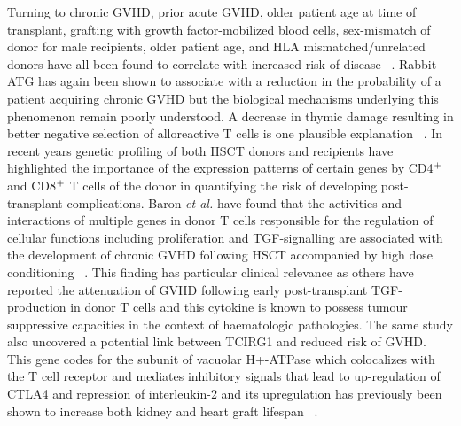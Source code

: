 Turning to chronic GVHD, prior acute GVHD, older patient age at time of transplant, grafting with growth factor-mobilized blood cells, sex-mismatch of donor for male recipients, older patient age, and HLA mismatched/unrelated donors have all been found to correlate with increased risk of disease ~\autocite{Flo2011}. Rabbit ATG has again been shown to associate with a reduction in the probability of a patient acquiring chronic GVHD but the biological mechanisms underlying this phenomenon remain poorly understood. A decrease in thymic damage resulting in better negative selection of alloreactive T cells is one plausible explanation ~\autocite{Flo2011}. In recent years genetic profiling of both HSCT donors and recipients have highlighted the importance of the expression patterns of certain genes by CD4$\textsuperscript{+}$ and CD8$\textsuperscript{+}$ T cells of the donor in quantifying the risk of developing post-transplant complications. Baron \textit{et al.} have found that the activities and interactions of multiple genes in donor T cells responsible for the regulation of cellular functions including proliferation and TGF-\textbeta signalling are associated with the development of chronic GVHD following HSCT accompanied by high dose conditioning ~\autocite{Bar2007}. This finding has particular clinical relevance as others have reported the attenuation of GVHD following early post-transplant TGF-\textbeta production in donor T cells and this cytokine is known to possess tumour suppressive capacities in the context of haematologic pathologies. The same study also uncovered a potential link between TCIRG1 and reduced risk of GVHD. This gene codes for the  subunit of vacuolar H+-ATPase which colocalizes with the T cell receptor and mediates inhibitory signals that lead to up-regulation of CTLA4 and repression of interleukin-2 and its upregulation has previously been shown to increase both kidney and heart graft lifespan ~\autocite{Bar2007}.

